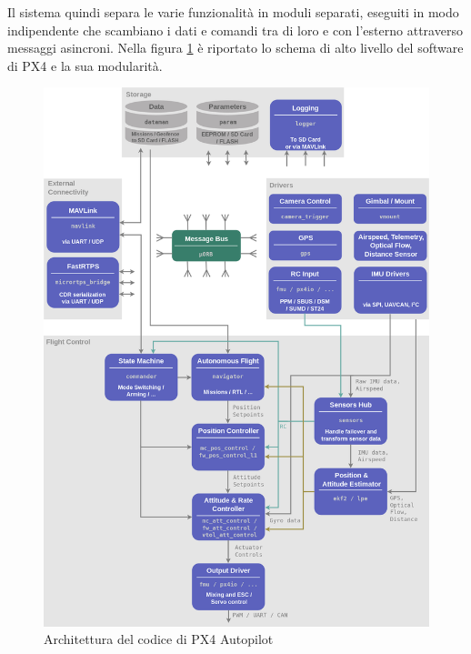 Il sistema quindi separa le varie funzionalità in moduli separati, eseguiti in modo indipendente che scambiano i dati e comandi tra di loro e con l'esterno attraverso messaggi asincroni.
Nella figura \ref{fig:px4.architettura} è riportato lo schema di alto livello del software di PX4 e la sua modularità.

\begin{figure}[ht]
	\centering
	\includegraphics[width=1\textwidth]{SistemaQuadrirotore/Figure/PX4_Architecture}
	\caption{Architettura del codice di PX4 Autopilot}
	\label{fig:px4.architettura}
\end{figure}
